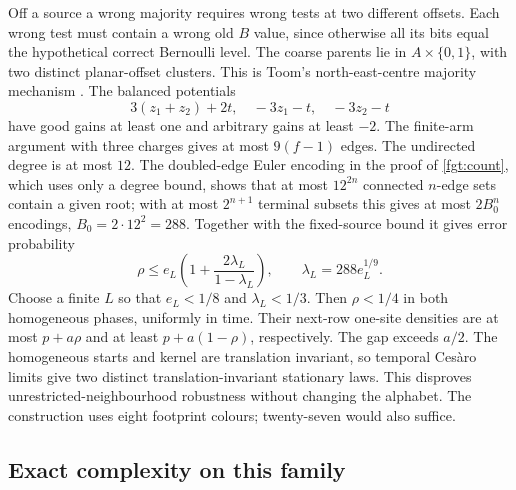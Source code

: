 \begin{remark}
Off a source a wrong majority requires wrong tests at two different offsets. Each wrong test must contain a wrong old $B$ value, since otherwise all its bits equal the hypothetical correct Bernoulli level. The coarse parents lie in $A\times\{0,1\}$, with two distinct planar-offset clusters. This is Toom's north-east-centre majority mechanism \cite{Toom80}. The balanced potentials
\[
 3(z_1+z_2)+2t,\quad-3z_1-t,\quad-3z_2-t
\]
have good gains at least one and arbitrary gains at least $-2$. The finite-arm argument with three charges gives at most $9(f-1)$ edges. The undirected degree is at most $12$. The doubled-edge Euler encoding in the proof of \cref{fgt:count}, which uses only a degree bound, shows that
at most $12^{2n}$ connected $n$-edge sets contain a given root; with at most $2^{n+1}$ terminal subsets
this gives at most $2B_0^n$ encodings, $B_0=2\cdot12^2=288$. Together with the fixed-source bound it gives
error probability
\[
 \rho\le e_L\left(1+\frac{2\lambda_L}{1-\lambda_L}\right),
 \qquad\lambda_L=288e_L^{1/9}.
\]
Choose a finite $L$ so that $e_L<1/8$ and $\lambda_L<1/3$. Then $\rho<1/4$ in both homogeneous phases, uniformly in time. Their next-row one-site densities are at most $p+a\rho$ and at least $p+a(1-\rho)$, respectively. The gap exceeds $a/2$. The homogeneous starts and kernel are translation invariant, so temporal Ces\`aro limits give two distinct translation-invariant stationary laws. This disproves unrestricted-neighbourhood robustness without changing the alphabet. The construction uses eight footprint colours; twenty-seven would also suffice.
\end{remark}

\subsection{Exact complexity on this family}

